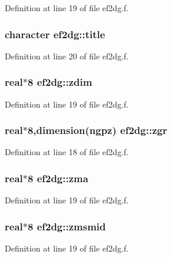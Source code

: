 Definition at line 19 of file ef2dg.f.\hypertarget{namespaceef2dg_563527db7cfae449ff7b79b8c5317a7e}{
\subsubsection[title]{\setlength{\rightskip}{0pt plus 5cm}character {\bf ef2dg::title}}}
\label{namespaceef2dg_563527db7cfae449ff7b79b8c5317a7e}




Definition at line 20 of file ef2dg.f.\hypertarget{namespaceef2dg_b82c3339f920d26c7fabe95ce9f384ae}{
\subsubsection[zdim]{\setlength{\rightskip}{0pt plus 5cm}real$\ast$8 {\bf ef2dg::zdim}}}
\label{namespaceef2dg_b82c3339f920d26c7fabe95ce9f384ae}




Definition at line 19 of file ef2dg.f.\hypertarget{namespaceef2dg_e89bb2455ad1b4ab57df511af6651cea}{
\subsubsection[zgr]{\setlength{\rightskip}{0pt plus 5cm}real$\ast$8,dimension(ngpz) {\bf ef2dg::zgr}}}
\label{namespaceef2dg_e89bb2455ad1b4ab57df511af6651cea}




Definition at line 18 of file ef2dg.f.\hypertarget{namespaceef2dg_4bfe1ad02972fee5ac5227dee3e60116}{
\subsubsection[zma]{\setlength{\rightskip}{0pt plus 5cm}real$\ast$8 {\bf ef2dg::zma}}}
\label{namespaceef2dg_4bfe1ad02972fee5ac5227dee3e60116}




Definition at line 19 of file ef2dg.f.\hypertarget{namespaceef2dg_4061e999562aae54b6b48dfafd56c64d}{
\subsubsection[zmsmid]{\setlength{\rightskip}{0pt plus 5cm}real$\ast$8 {\bf ef2dg::zmsmid}}}
\label{namespaceef2dg_4061e999562aae54b6b48dfafd56c64d}




Definition at line 19 of file ef2dg.f.